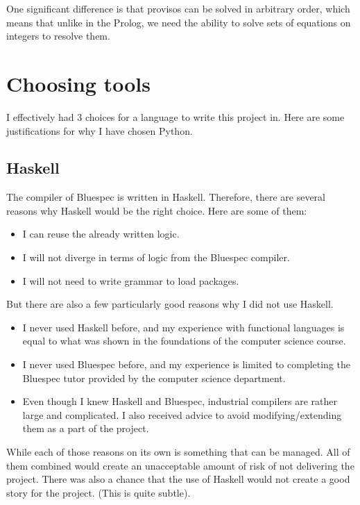 \documentclass[12pt]{report}
\begin{document}
One significant difference is that provisos can be solved in arbitrary order, which means that unlike in the Prolog, we need the ability to solve sets of equations on integers to resolve them.

\section{Choosing tools}
I effectively had 3 choices for a language to write this project in. Here are some justifications for why I have chosen Python.   

\subsection{Haskell}  

The compiler of Bluespec is written in Haskell. Therefore, there are several reasons why Haskell would be the right choice. Here are some of them:  
\begin{itemize}  
   \item I can reuse the already written logic.  
   \item I will not diverge in terms of logic from the Bluespec compiler.  
   \item I will not need to write grammar to load packages.  
\end{itemize}  
But there are also a few particularly good reasons why I did not use Haskell.  
\begin{itemize}  

   \item I never used Haskell before, and my experience with functional languages is equal to what was shown in the foundations of the computer science course.  

   \item I never used Bluespec before, and my experience is limited to completing the Bluespec tutor provided by the computer science department.  

   \item Even though I knew Haskell and Bluespec, industrial compilers are rather large and complicated. I also received advice to avoid modifying/extending them as a part of the project.  

\end{itemize}  

While each of those reasons on its own is something that can be managed. All of them combined would create an unacceptable amount of risk of not delivering the project. There was also a chance that the use of Haskell would not create a good story for the project. (This is quite subtle). 
\end{document}
